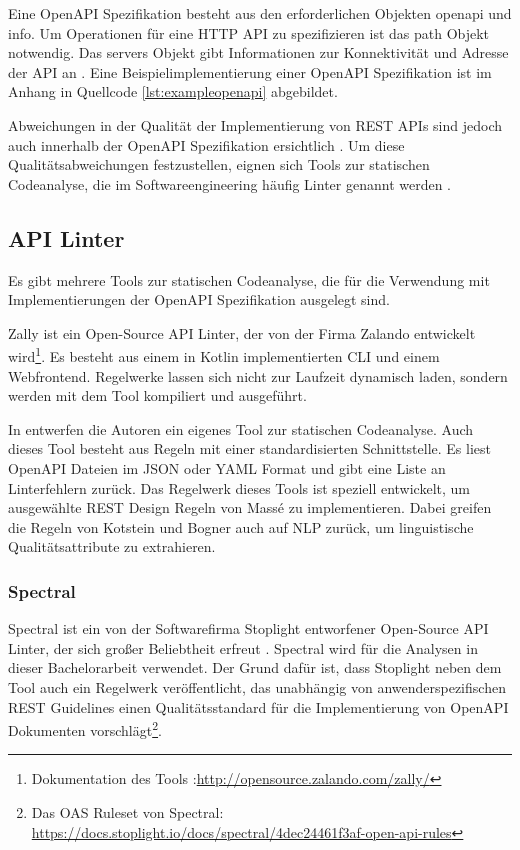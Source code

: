 Eine OpenAPI Spezifikation besteht aus den erforderlichen Objekten openapi und info. Um Operationen für eine \acs{HTTP} \acs{API} zu spezifizieren ist das path Objekt notwendig. Das servers Objekt gibt Informationen zur Konnektivität und Adresse der \acs{API} an \parencite{noauthor_openapi_2024}. Eine Beispielimplementierung einer OpenAPI Spezifikation ist im Anhang in Quellcode \ref{lst:exampleopenapi} abgebildet.

Abweichungen in der Qualität der Implementierung von \acs{REST} \acs{API}s sind jedoch auch innerhalb der OpenAPI Spezifikation ersichtlich \parencite{vaziri_generating_2017}. Um diese Qualitätsabweichungen festzustellen, eignen sich Tools zur statischen Codeanalyse, die im Softwareengineering häufig Linter genannt werden \parencite{tomasdottir_adoption_2018}.

\subsection{API Linter} \label{sec:apilinter}
Es gibt mehrere Tools zur statischen Codeanalyse, die für die Verwendung mit Implementierungen der OpenAPI Spezifikation ausgelegt sind.

Zally ist ein Open-Source API Linter, der von der Firma Zalando entwickelt wird\footnote{Dokumentation des Tools :\href{http://opensource.zalando.com/zally/}{http://opensource.zalando.com/zally/}}. Es besteht aus einem in Kotlin implementierten \acf{CLI} und einem Webfrontend. Regelwerke lassen sich nicht zur Laufzeit dynamisch laden, sondern werden mit dem Tool kompiliert und ausgeführt.

In \parencite{bogner_restruler_2024} entwerfen die Autoren ein eigenes Tool zur statischen Codeanalyse. Auch dieses Tool besteht aus Regeln mit einer standardisierten Schnittstelle. Es liest OpenAPI Dateien im \acs{JSON} oder \acs{YAML} Format und gibt eine Liste an Linterfehlern zurück. Das Regelwerk dieses Tools ist speziell entwickelt, um ausgewählte \acs{REST} Design Regeln von Massé \parencite{masse_rest_2011} zu implementieren. Dabei greifen die Regeln von Kotstein und Bogner auch auf \acf{NLP} zurück, um linguistische Qualitätsattribute zu extrahieren.


\subsubsection{Spectral} \label{sec:spectral}
Spectral ist ein von der Softwarefirma Stoplight entworfener Open-Source \acs{API} Linter, der sich großer Beliebtheit erfreut \parencite{bogner_restruler_2024}. Spectral wird für die Analysen in dieser Bachelorarbeit verwendet. Der Grund dafür ist, dass Stoplight neben dem Tool auch ein Regelwerk veröffentlicht, das unabhängig von anwenderspezifischen \acs{REST} Guidelines einen Qualitätsstandard für die Implementierung von OpenAPI Dokumenten vorschlägt\footnote{Das \acs{OAS} Ruleset von Spectral: \href{https://docs.stoplight.io/docs/spectral/4dec24461f3af-open-api-rules}{https://docs.stoplight.io/docs/spectral/4dec24461f3af-open-api-rules}}.

